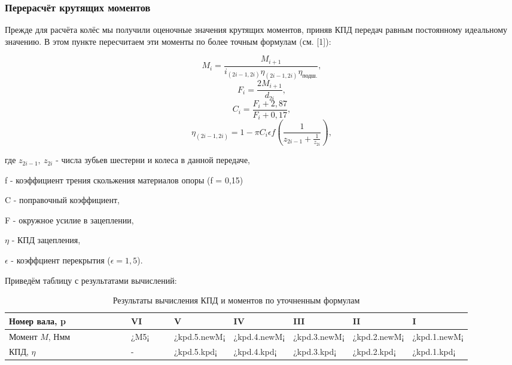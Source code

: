 \documentclass[14pt,a4paper,russian]{scrartcl}
\begin{document}
    \subsubsection{Перерасчёт крутящих моментов}
        Прежде для расчёта колёс мы получили оценочные значения крутящих моментов,
        приняв КПД передач равным постоянному идеальному значению. 
        В этом пункте пересчитаем эти моменты по более точным формулам (см. [1]):

        \[ M_i = \frac{M_{i+1}}{i_{(2i-1, 2i)}\eta_{(2i-1, 2i)}\eta_{\text{подш.}}}, \]
        \[ F_i = \frac{2M_{i+1}}{d_{2i}}, \]
        \[ C_i = \frac{F_i+2,87}{F_i+0,17}, \]
        \[ \eta_{(2i-1, 2i)} = 1 - \pi C_i\epsilon f (\frac{1}{z_{2i-1} + \frac{1}{z_{2i}}}), \]

        где\qquad
            \( z_{2i-1},\ z_{2i} \) - числа зубьев шестерни и колеса в данной передаче,\par 
            \qquad f - коэффициент трения скольжения материалов опоры (f = 0,15) \par 
            \qquad C - поправочный коэффициент,\par 
            \qquad F - окружное усилие в зацеплении,\par 
            \qquad \( \eta \) - КПД зацепления,\par 
            \qquad \( \epsilon \) - коэффциент перекрытия (\( \epsilon=1,5 \)).\par
        

        Приведём таблицу с результатами вычислений:
        \begin{table}[h!]
            \begin{center}
                \begin{tabular}{p{0.3\linewidth}p{0.1\linewidth}p{0.1\linewidth}p{0.1\linewidth}p{0.1\linewidth}p{0.1\linewidth}p{0.1\linewidth}}
                    \hline
                    Номер вала, p & VI & V & IV & III & II & I \\
                    \hline
                    Момент \( M \), Нмм & ¿M5¡ & ¿kpd.5.newM¡ & ¿kpd.4.newM¡ & ¿kpd.3.newM¡ & ¿kpd.2.newM¡ & ¿kpd.1.newM¡  \\
                    \hline
                    КПД, \( \eta \) & - & ¿kpd.5.kpd¡ & ¿kpd.4.kpd¡ & ¿kpd.3.kpd¡ & ¿kpd.2.kpd¡ & ¿kpd.1.kpd¡ \\
                    \hline
                \end{tabular}
                \caption{Результаты вычисления КПД и моментов по уточненным формулам}\label{tab:gears_kpd}
            \end{center}
        \end{table}
        
\end{document}
